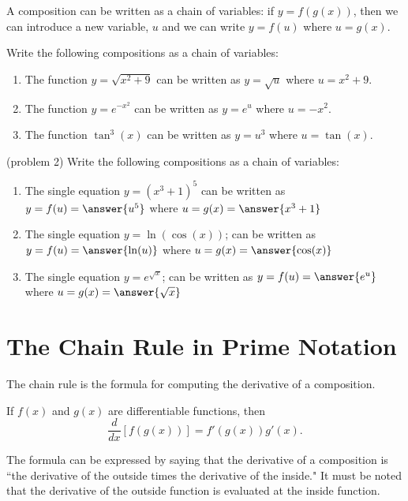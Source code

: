 \documentclass[handout]{ximera}
\begin{document}
A composition can be written as a chain of variables: if $y = f(g(x))$, then we can introduce a new variable, $u$ and we can write
$y = f(u)$ where $u = g(x)$. 
\begin{example}[example 2]
Write the following compositions as a chain of variables:
\begin{enumerate}
\item The function \quad $y = \sqrt{x^2 + 9}$ \quad can be written as $y = \sqrt{u}$ where $u = x^2 + 9$.
\item The function \quad $y =e^{-x^2}$ \quad can be written as $y = e^u$ where $u = -x^2$.
\item The function \quad $\tan^3(x)$ \quad can be written as $y = u^3$ where $u = \tan(x)$.
\end{enumerate}
\end{example}

\begin{problem}(problem 2)
Write the following compositions as a chain of variables:
\begin{enumerate}
\item The single equation $y = (x^3 + 1)^5$ can be written as $y = f(u) = \answer{u^5}$ where $u = g(x) = \answer{x^3 + 1}$
\item The single equation $y = \ln(\cos(x))$; can be written as $y = f(u) = \answer{\ln(u)}$ where $u = g(x) = \answer{\cos(x)}$
\item The single equation $y = e^{\sqrt{x}}$; can be written as $y = f(u) = \answer{e^u}$ where $u = g(x) = \answer{\sqrt{x}}$
\end{enumerate}
\end{problem}

\section{The Chain Rule in Prime Notation}
The chain rule is the formula for computing the derivative of a composition.
\begin{theorem} If $f(x)$ and $g(x)$ are differentiable functions, then
\[
\frac{d}{dx}\left[f(g(x))\right] = f'(g(x))g'(x).
\]
\end{theorem}
The formula can be expressed by saying that the derivative of a composition is ``the derivative of the outside   
times the derivative of the inside." It must be noted that the derivative of the outside function is evaluated at the inside function.  
\end{document}
